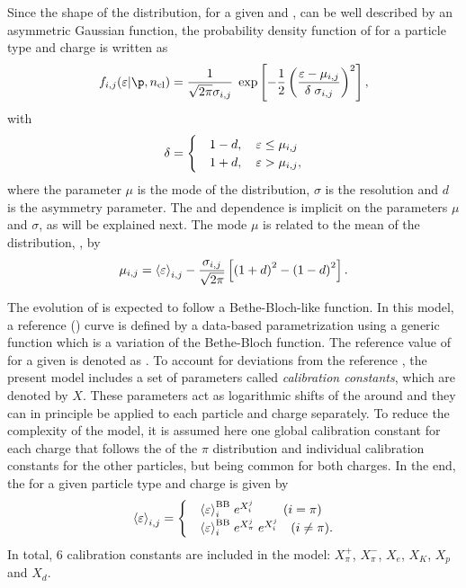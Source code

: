 Since the shape of the \eps distribution, for a given \ncl and \p,
can be well described by an asymmetric Gaussian function, the
probability density function of \eps for a particle type
\ipart and charge \ich is written as
\begin{equation}
  f_{\ipart,\ich}(\eps|\p,\ncl) = \frac{1}{\sqrt{2\pi}\sigma_{\ipart,\ich}} \;
  \exp\left[-\frac{1}{2}\left(\frac{\eps-\mu_{\ipart,\ich}}{\delta \; \sigma_{\ipart,\ich}}\right)^2\right],
  \label{eq:dedx:model:pdf}
\end{equation}
with
\begin{equation}
  \delta =
  \begin{cases}
    & 1-d, \ \ \ \mbox{$\varepsilon$} \le \mu_{i,j} \\
    & 1+d, \ \ \ \mbox{$\varepsilon$} > \mu_{i,j}, \\
  \end{cases}
  \label{eq:dedx:model:asymm}
\end{equation}
where the parameter $\mu$ is the mode of the distribution, $\sigma$ is the resolution
and $d$ is the asymmetry parameter. The \p and \ncl dependence is implicit
on the parameters $\mu$ and $\sigma$, as will be explained next.
The mode $\mu$ is related to the mean of the distribution, \meaneps, by
\begin{equation}
  \mu_{i,j} = \mbox{$\langle\varepsilon\rangle$}_{i,j} - \frac{\sigma_{i,j}}{\sqrt{2\pi}}
  \left[\left(1+d\right)^2 - \left(1-d\right)^2 \right].
  \label{eq:dedx:model:mu}
\end{equation}

The \p evolution of \meaneps is expected to follow
a Bethe-Bloch-like function. In this model, a reference
\meaneps(\p) curve is defined by a data-based
parametrization using a generic function which is a
variation of the Bethe-Bloch function. The reference value
of \meaneps for a given \p is denoted as \meanepsbb.
To account for deviations from the reference \meaneps,
the present model includes a set of parameters called
\textit{calibration constants}, which are denoted by $X$.
These parameters act as logarithmic shifts of the \meaneps
around \meanepsbb and they can in principle be applied
to each particle and charge separately. To reduce the complexity
of the model, it is assumed here one global calibration constant
for each charge that follows the \meaneps of the $\pi$ distribution
and individual calibration constants for the other particles,
but being common for both charges. In the end, the \meaneps for a
given particle type \ipart and charge \ich is given by
\begin{equation}
  \meaneps_{\ipart,\ich} =
  \begin{cases}
    & \meaneps_{\ipart}^\text{BB} \; e^{X_{\ipart}^{\ich}} \ \ \ \ \ \ \ (i=\pi) \\
    & \meaneps_{\ipart}^\text{BB} \; e^{X_{\pi}^{\ich}} \; e^{X_{\ipart}^{\ich}} \ \ \ (i\neq\pi).
  \end{cases}
  \label{eq:dedx:model:cal}
\end{equation}
In total, 6 calibration constants are included in the model:
$X_{\pi}^{+}$, $X_{\pi}^{-}$, $X_{e}$, $X_{K}$, $X_{p}$ and $X_{d}$.

